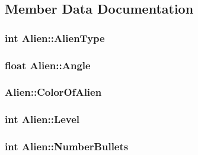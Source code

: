 \subsection{Member Data Documentation}
\hypertarget{classAlien_a61485dedd63ff541e37532225f4398d6}{
\subsubsection[{Alien\-Type}]{\setlength{\rightskip}{0pt plus 5cm}int Alien\-::\-Alien\-Type\hspace{0.3cm}{\ttfamily [private]}}}\label{classAlien_a61485dedd63ff541e37532225f4398d6}
\hypertarget{classAlien_ab6cbf1c61145bcfad50b113ff6f50df4}{
\subsubsection[{Angle}]{\setlength{\rightskip}{0pt plus 5cm}float Alien\-::\-Angle\hspace{0.3cm}{\ttfamily [private]}}}\label{classAlien_ab6cbf1c61145bcfad50b113ff6f50df4}
\hypertarget{classAlien_af40f8716e363c89fafada132762d3292}{
\subsubsection[{Color\-Of\-Alien}]{ Alien\-::\-Color\-Of\-Alien\hspace{0.3cm}{\ttfamily [private]}}}\label{classAlien_af40f8716e363c89fafada132762d3292}
\hypertarget{classAlien_a42b68f9cb4113b51ee2c8ade1ec2bda3}{
\subsubsection[{Level}]{\setlength{\rightskip}{0pt plus 5cm}int Alien\-::\-Level\hspace{0.3cm}{\ttfamily [private]}}}\label{classAlien_a42b68f9cb4113b51ee2c8ade1ec2bda3}
\hypertarget{classAlien_a0759bffcb3f5e8e50f94c4238df3572f}{
\subsubsection[{Number\-Bullets}]{\setlength{\rightskip}{0pt plus 5cm}int Alien\-::\-Number\-Bullets\hspace{0.3cm}{\ttfamily [private]}}}\label{classAlien_a0759bffcb3f5e8e50f94c4238df3572f}
